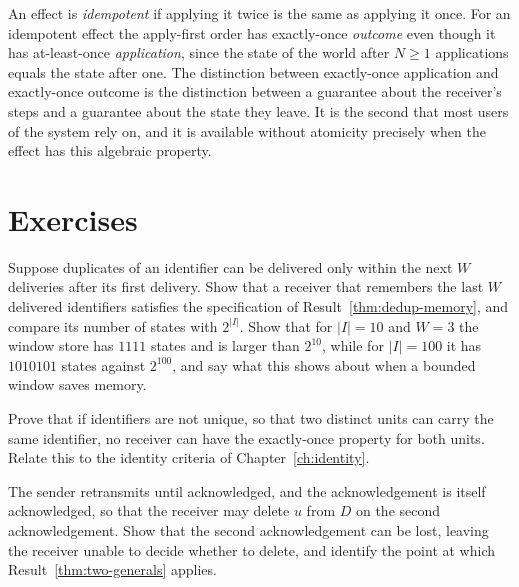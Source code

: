 \begin{remark}
An effect is \emph{idempotent} if applying it twice is the same as applying it once. For an idempotent effect the apply-first order has exactly-once \emph{outcome} even though it has at-least-once \emph{application}, since the state of the world after $N\ge1$ applications equals the state after one. The distinction between exactly-once application and exactly-once outcome is the distinction between a guarantee about the receiver's steps and a guarantee about the state they leave. It is the second that most users of the system rely on, and it is available without atomicity precisely when the effect has this algebraic property.
\end{remark}

\section*{Exercises}

\begin{exercise}\label{ex:window}
Suppose duplicates of an identifier can be delivered only within the next $W$ deliveries after its first delivery. Show that a receiver that remembers the last $W$ delivered identifiers satisfies the specification of Result~\ref{thm:dedup-memory}, and compare its number of states with $2^{|I|}$. Show that for $|I|=10$ and $W=3$ the window store has $1111$ states and is larger than $2^{10}$, while for $|I|=100$ it has $1010101$ states against $2^{100}$, and say what this shows about when a bounded window saves memory.
\end{exercise}

\begin{exercise}
Prove that if identifiers are not unique, so that two distinct units can carry the same identifier, no receiver can have the exactly-once property for both units. Relate this to the identity criteria of Chapter~\ref{ch:identity}.
\end{exercise}

\begin{exercise}
The sender retransmits until acknowledged, and the acknowledgement is itself acknowledged, so that the receiver may delete $u$ from $D$ on the second acknowledgement. Show that the second acknowledgement can be lost, leaving the receiver unable to decide whether to delete, and identify the point at which Result~\ref{thm:two-generals} applies.
\end{exercise}

